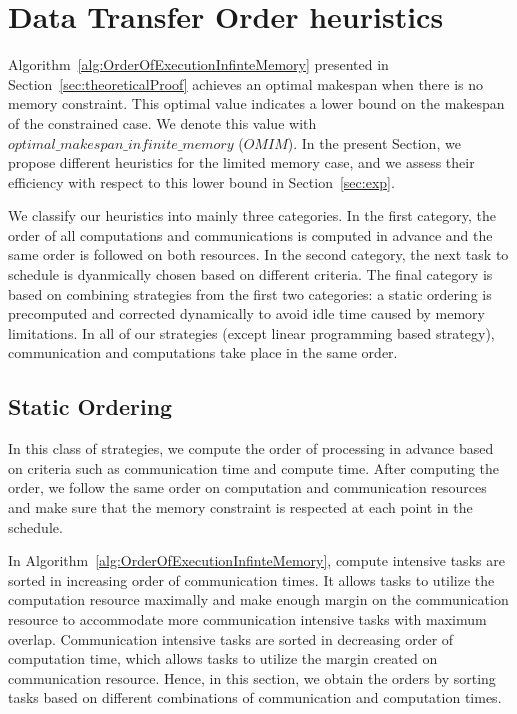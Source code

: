 \documentclass[sigconf]{acmart}
\begin{document}
	
	
	\section{Data Transfer Order heuristics}
	\label{sec:heuristics}
	
	Algorithm~\ref{alg:OrderOfExecutionInfinteMemory} presented in Section~\ref{sec:theoreticalProof} achieves an optimal makespan when there is no memory constraint. This optimal value indicates a lower bound on the makespan of the constrained case. We denote this value with $optimal\_ \allowbreak makespan\_  \allowbreak infinite\_  \allowbreak memory$ ($OMIM$). In the present Section, we propose different heuristics for the limited memory case, and we assess their efficiency with respect to this lower bound in Section~\ref{sec:exp}.
	
	
	We classify our heuristics into mainly three categories. In the first category, the order of all computations and communications is computed in advance and the same order is followed on both resources. In the second category, the next task to schedule is dyanmically chosen based on different criteria. The final category is based on combining strategies from the first two categories: a static ordering is precomputed and corrected dynamically to avoid idle time caused by memory limitations. In all of our strategies (except linear programming based strategy), communication and computations take place in the same order.
	
	\subsection{Static Ordering}
	In this class of strategies, we compute the order of processing in advance based on criteria such as communication time and compute time. After computing the order, we follow the same order on computation and communication resources and make sure that the memory constraint is respected at each point in the schedule.
	
	In Algorithm~\ref{alg:OrderOfExecutionInfinteMemory}, compute intensive tasks are sorted in increasing order of communication times. It allows tasks to utilize the computation resource maximally and make enough margin on the communication resource to accommodate more communication intensive tasks with maximum overlap. Communication intensive tasks are sorted in decreasing order of computation time, which allows tasks to utilize the margin created on communication resource. Hence, in this section, we obtain the orders by sorting tasks based on different combinations of communication and computation times.
	
\end{document}
